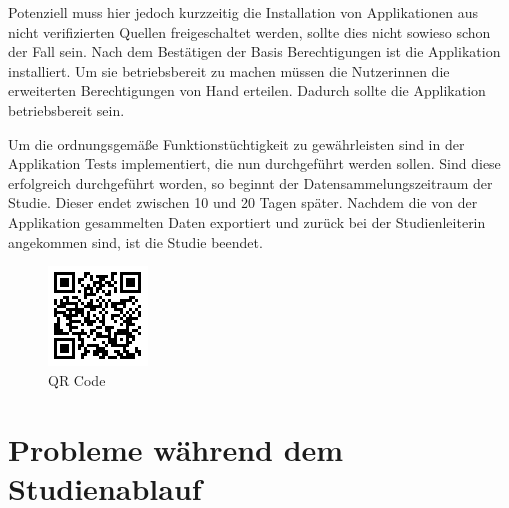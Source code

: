 Potenziell muss hier jedoch kurzzeitig die Installation von Applikationen aus nicht verifizierten Quellen freigeschaltet werden, sollte dies nicht sowieso schon der Fall sein.
Nach dem Bestätigen der Basis Berechtigungen ist die Applikation installiert.
Um sie betriebsbereit zu machen müssen die Nutzerinnen die erweiterten Berechtigungen von Hand erteilen.
Dadurch sollte die Applikation betriebsbereit sein.
\par
Um die ordnungsgemäße Funktionstüchtigkeit zu gewährleisten sind in der Applikation Tests implementiert, die nun durchgeführt werden sollen.
Sind diese erfolgreich durchgeführt worden, so beginnt der Datensammelungszeitraum der Studie.
Dieser endet zwischen 10 und 20 Tagen später.
Nachdem die von der Applikation gesammelten Daten exportiert und zurück bei der Studienleiterin angekommen sind, 
ist die Studie beendet.

\begin{figure}[h]
    \centering
    \includegraphics{images/qrcode.png}
    \caption{QR Code}
    \label{fig:qrcode}
\end{figure}


\section{Probleme während dem Studienablauf}

